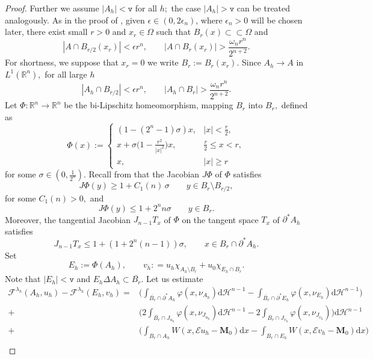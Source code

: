 \documentclass[reqno]{amsart}
\numberwithin{equation}{section}
\theoremstyle{plain}
\theoremstyle{definition}
\newcommand{\R}{\mathbb{R}}
\newcommand{\bM}{\mathbf{M}}
\newcommand{\fm}{\mathtt{v}}
\newcommand{\cH}{\mathcal{H}}
\newcommand{\cF}{\mathcal{F}}
\newcommand{\p}{\partial}
\newcommand{\cl}[1]{\overline{#1}}
\renewcommand{\d}{\mathrm{d}}
\newcommand{\strictlyincluded}{\subset\subset}
\newcommand{\str}[1]{\mathcal{E}#1}
\begin{document}
\begin{proof}
Further we assume $|A_h|<\fm$ for all $h;$ the case $|A_h|>\fm$ can be treated analogously. As in the proof of \cite[Theorem 1.1]{EF:2011},  given $\epsilon\in(0,2\epsilon_n)$, where $\epsilon_n>0$ will be chosen later, there exist small  $r>0$ and $x_r\in\Omega$ such that  $B_r(x)\strictlyincluded\Omega$ and
$$
|A\cap B_{r/2}(x_r)|<\epsilon r^n,\qquad |A\cap B_r(x_r)|>\frac{\omega_n r^n}{2^{n+2}}.
$$
For shortness, we suppose that $x_r=0$ we write $B_r:=B_r(x_r).$  Since $A_h\to A$ in $L^1 (\R^n),$ for all large $h$
\begin{equation*} 
|A_h\cap B_{r/2}|<\epsilon r^n,\qquad |A_h\cap B_r|>\frac{\omega_n r^n}{2^{n+2}}. 
\end{equation*}
%
Let $\Phi:\R^n\to \R^n$ be the bi-Lipschitz homeomorphism, mapping $B_r$ into $B_r,$ defined as
$$
\Phi(x):= 
\begin{cases}
(1 - (2^n-1)\sigma)x, & |x|<\frac r2,\\
x+ \sigma\Big(1 - \frac{r^2}{|x|^2}\Big)x, & \frac{r}{2} \le x < r,\\
x, & |x|\ge r 
\end{cases}
%
$$
for some $\sigma\in(0,\frac{1}{2^n}).$ 
Recall from \cite[pp. 420-422]{EF:2011} that 
the Jacobian $J\Phi$ of $\Phi$ satisfies 
$$
J\Phi(y) \ge 1+ C_1(n)\,\sigma \qquad y\in B_r\setminus B_{r/2},
$$
for some $C_1(n)>0,$
and 
$$
J\Phi(y) \le 1+ 2^nn\sigma \qquad y\in B_r.
$$
Moreover, the tangential Jacobian $J_{n-1}T_x$ of $\Phi$ on the tangent space $T_x$ of $\p^* A_h$ satisfies 
\begin{equation}\label{tang_jacob}
J_{n-1}T_x \le 1+(1 + 2^n(n-1))\sigma,\qquad x\in B_r \cap \p^* A_h.  
\end{equation}
%
Set 
\begin{equation}
E_h:= \Phi(A_h),\qquad v_h: =u_h\chi_{A_h\setminus B_r}^{} + u_0\chi_{E_h\cap B_r}^{}.
\label{shaushaush}
\end{equation}
%
Note that $|E_h|<\fm$ and $E_h\Delta A_h\subset \overline{B_r}.$  Let us estimate
\begin{align}
\cF^{\lambda_h}(A_h,u_h) - \cF^{\lambda_h}(E_h,v_h)
= &\Big(\int_{\cl{B_r}\cap \p^*A_h} \varphi(x,\nu_{A_h})\d\cH^{n-1} -
\int_{\cl{B_r}\cap \p^*E_h} \varphi(x,\nu_{E_h})\d\cH^{n-1}\Big) \nonumber \\
+ & \Big(2\int_{\overline{B_r}\cap J_{u_h}} \varphi(x,\nu_{J_{u_h}})\d\cH^{n-1}
- 2\int_{\overline{B_r}\cap J_{v_h}} \varphi(x,\nu_{J_{v_h}})\Big)\d\cH^{n-1}\nonumber \\
+ & \Big( \int_{B_r\cap A_h} W(x,\str{u_h} - \bM_0)\d x - \int_{B_r\cap E_h} W(x,\str{v_h} - \bM_0)\d x \Big) \nonumber \\

\end{align}
\end{proof}
\end{document}
